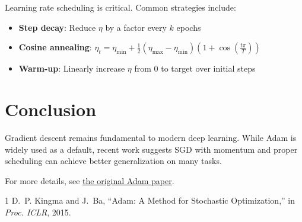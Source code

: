 \documentclass[conference]{IEEEtran}
\begin{document}
Learning rate scheduling is critical. Common strategies include:

\begin{itemize}
\item \textbf{Step decay}: Reduce $\eta$ by a factor every $k$ epochs
\item \textbf{Cosine annealing}: $\eta_t = \eta_{\min} + \frac{1}{2}(\eta_{\max} - \eta_{\min})(1 + \cos(\frac{t\pi}{T}))$
\item \textbf{Warm-up}: Linearly increase $\eta$ from 0 to target over initial steps
\end{itemize}

\section{Conclusion}

Gradient descent remains fundamental to modern deep learning. While Adam is widely used as a default, recent work suggests SGD with momentum and proper scheduling can achieve better generalization on many tasks.

For more details, see \href{https://arxiv.org/abs/1412.6980}{the original Adam paper}.

\begin{thebibliography}{1}
D.~P. Kingma and J.~Ba, ``Adam: A Method for Stochastic Optimization,'' in \emph{Proc. ICLR}, 2015.
\end{thebibliography}
\end{document}
